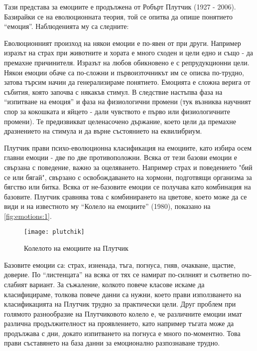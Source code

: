\documentclass[main.tex]{subfiles}
\begin{document}
Тази представа за емоциите е продължена от Робърт Плутчик (1927 - 2006). Базирайки се на еволюционната теория, той се опитва да опише понятието ``емоция''. Наблюденията му са следните:

Еволюционният произход на някои емоции е по-явен от при други. Например изразът на страх при животните и хората е много сходен и цели едно и също - да премахне причинителя. Изразът на любов обикновено е с репрудукционни цели. Някои емоции обаче са по-сложни и първоизточникът им се описва по-трудно, затова търсим начин да генерализираме понятието. Емоцията е сложна верига от събития, която започва с някакъв стимул. В следствие настъпва фаза на ``изпитване на емоция'' и фаза на физиологични промени (тук възниква научният спор за кокошката и яйцето - дали чувството е първо или физиологичните промени). Те предизвикват целенасочено държание, което цели да премахне дразнението на стимула и да върне състоянието на еквилибриум. 

Плутчик прави психо-еволюционна класификация на емоциите, като избира осем главни емоции - две по две противоположни. Всяка от тези базови емоции е свързана с поведение, важно за оцеляването. Например страх и поведението "бий се или бягай", свързано с освобождаването на хормони, подготвящи организма за бягство или битка. Всяка от не-базовите емоции се получава като комбинация на базовите. Плутчик сравнява това с комбинирането на цветове, което може да се види и на известното му ``Колело на емоциите'' (1980), показано на \autoref{fig:emotions:1}.

\begin{minipage}{0.45\textwidth}
    \begin{figure}[H]%
        \texttt{[image: plutchik]}
        \caption{Колелото на емоциите на Плутчик}
        \label{fig:emotions:1}
    \end{figure}
\end{minipage} \hfill
\begin{minipage}{0.45\textwidth}
    Базовите емоции са: страх, изненада, тъга, погнуса, гняв, очакване, щастие, доверие. По ``листенцата'' на всяка от тях се намират по-силният и съответно по-слабият вариант. За съжаление, колкото повече класове искаме да класифицираме, толкова повече данни са нужни, което прави използването на класификацията на Плутчик трудно за практически цели. Друг проблем при голямото разнообразие на Плутчиковото колело е, че различните емоции имат различна продължителност на проявлението, като например тъгата може да продължава с дни, докато изпитването на погнуса е много по-моментно. Това прави съставянето на база данни за емоционално разпознаване трудно.
\end{minipage}
\end{document}
